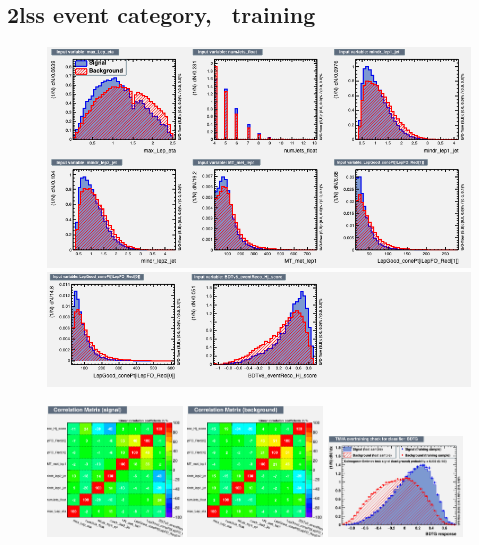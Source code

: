 \subsection*{2lss event category, \ttV\ training}
\begin{figure}[htb]
 \centering
 \includegraphics[width=\textwidth]{plots_extraction/training/train_2lss_ttv_hj_value/variables_id_c1}\\
 \includegraphics[width=\textwidth]{plots_extraction/training/train_2lss_ttv_hj_value/variables_id_c2}\\
\end{figure}
\begin{figure}[htb]
 \includegraphics[width=0.32\textwidth]{plots_extraction/training/train_2lss_ttv_hj_value/CorrelationMatrixS}
 \includegraphics[width=0.32\textwidth]{plots_extraction/training/train_2lss_ttv_hj_value/CorrelationMatrixB}
 \includegraphics[width=0.32\textwidth]{plots_extraction/training/train_2lss_ttv_hj_value/overtrain_BDTG.png}
\end{figure}

